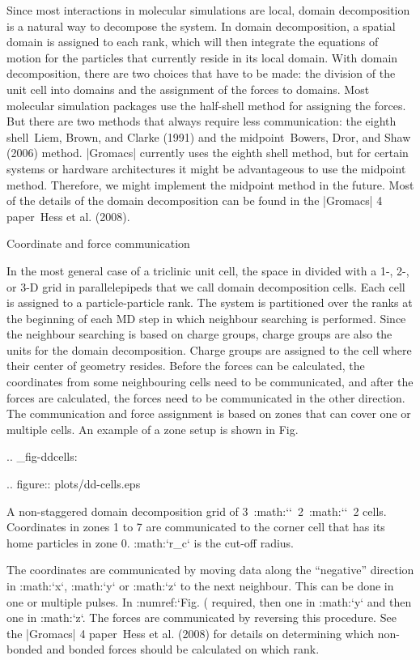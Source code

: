 {Since most interactions in molecular simulations are local, domain
decomposition is a natural way to decompose the system. In domain
decomposition, a spatial domain is assigned to each rank, which will
then integrate the equations of motion for the particles that currently
reside in its local domain. With domain decomposition, there are two
choices that have to be made: the division of the unit cell into domains
and the assignment of the forces to domains. Most molecular simulation
packages use the half-shell method for assigning the forces. But there
are two methods that always require less communication: the eighth
shell Liem, Brown, and Clarke (1991) and the midpoint Bowers, Dror, and
Shaw (2006) method. |Gromacs| currently uses the eighth shell method, but
for certain systems or hardware architectures it might be advantageous
to use the midpoint method. Therefore, we might implement the midpoint
method in the future. Most of the details of the domain decomposition
can be found in the |Gromacs| 4 paper Hess et al. (2008).

Coordinate and force communication
~~~~~~~~~~~~~~~~~~~~~~~~~~~~~~~~~~

In the most general case of a triclinic unit cell, the space in divided
with a 1-, 2-, or 3-D grid in parallelepipeds that we call domain
decomposition cells. Each cell is assigned to a particle-particle rank.
The system is partitioned over the ranks at the beginning of each MD
step in which neighbour searching is performed. Since the neighbour
searching is based on charge groups, charge groups are also the units
for the domain decomposition. Charge groups are assigned to the cell
where their center of geometry resides. Before the forces can be
calculated, the coordinates from some neighbouring cells need to be
communicated, and after the forces are calculated, the forces need to be
communicated in the other direction. The communication and force
assignment is based on zones that can cover one or multiple cells. An
example of a zone setup is shown in Fig. 

.. _fig-ddcells:

.. figure:: plots/dd-cells.eps

   A non-staggered domain decomposition grid of
   3\ :math:`\times`\ 2\ :math:`\times`\ 2 cells. Coordinates in zones 1
   to 7 are communicated to the corner cell that has its home particles
   in zone 0. :math:`r_c` is the cut-off radius.

The coordinates are communicated by moving data along the “negative”
direction in :math:`x`, :math:`y` or :math:`z` to the next neighbour.
This can be done in one or multiple pulses. In
:numref:`Fig. (%
required, then one in :math:`y` and then one in :math:`z`. The forces
are communicated by reversing this procedure. See the |Gromacs| 4
paper Hess et al. (2008) for details on determining which non-bonded and
bonded forces should be calculated on which rank.

}
